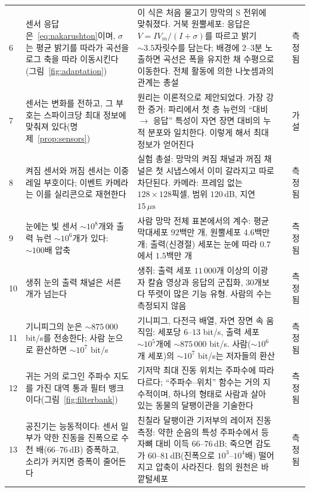 {\begin{longtable}{>{\raggedright}p{0.5cm}>{\raggedright}p{4.0cm}>{\raggedright}p{5.6cm}>{\raggedright}p{2.3cm}>{\raggedright\arraybackslash}p{1.7cm}}
6 & 센서 응답은~\eqref{eq:nakarushton}이며, $\sigma$는 평균 밝기를 따라가 곡선을 로그 축을 따라 이동시킨다(그림~\ref{fig:adaptation}) & 이 식은 처음 물고기 망막의 S 전위에 맞춰졌다. 거북 원뿔세포: 응답은 $V=I V_m/(I+\sigma)$를 따르고 밝기 $\sim3.5$자릿수를 담는다; 배경에 $2$--$3$분 노출하면 곡선은 폭을 유지한 채 수평으로 이동한다. 전체 활동에 의한 나눗셈과의 관계는 총설 & \cite{NakaRushton1966,NormannPerlman1979,Carandini2012} & 측정됨 \\
7 & 센서는 변화를 전하고, 그 부호는 스파이크당 최대 정보에 맞춰져 있다(명제~\ref{prop:sensors}) & 원리는 이론적으로 제안되었다. 가장 강한 증거: 파리에서 첫 층 뉴런의 “대비 $\to$ 응답” 특성이 자연 장면 대비의 누적 분포와 일치한다. 이렇게 해서 최대 정보가 얻어진다 & \cite{Barlow1961,Laughlin1981} & 가설 \\
8 & 켜짐 센서와 꺼짐 센서는 이중 레일 부호이다; 이벤트 카메라는 이를 실리콘으로 재현한다 & 실험 총설: 망막의 켜짐 채널과 꺼짐 채널은 첫 시냅스에서 이미 갈라지고 따로 차단된다. 카메라: 프레임 없는 $128\times128$픽셀, 범위 $120$\,dB, 지연 $15\,\mu\text{s}$ & \cite{Schiller1992,Lichtsteiner2008,Gallego2022} & 측정됨 \\
9 & 눈에는 빛 센서 $\sim10^8$개와 출력 뉴런 $\sim10^6$개가 있다: $\sim100$배 압축 & 사람 망막 전체 표본에서의 계수: 평균 막대세포 $92$백만 개, 원뿔세포 $4.6$백만 개; 출력(신경절) 세포는 눈에 따라 $0.7$에서 $1.5$백만 개 & \cite{Curcio1990,CurcioAllen1990} & 측정됨 \\
10 & 생쥐 눈의 출력 채널은 서른 개가 넘는다 & 생쥐: 출력 세포 $11\,000$개 이상의 이광자 칼슘 영상과 응답의 군집화, $30$개보다 뚜렷이 많은 기능 유형. 사람의 수는 측정되지 않음 & \cite{Baden2016} & 측정됨 \\
11 & 기니피그의 눈은 $\sim875\,000$ bit/s를 전송한다; 사람 눈으로 환산하면 $\sim10^7$ bit/s & 기니피그, 다전극 배열, 자연 장면 속 움직임: 세포당 $6$--$13$ bit/s, 출력 세포 $\sim10^5$개에 $\sim875\,000$ bit/s. 사람($\sim10^6$개 세포)의 $\sim10^7$ bit/s는 저자들의 환산 & \cite{Koch2006} & 측정됨 \\
12 & 귀는 거의 로그인 주파수 지도를 가진 대역 통과 필터 뱅크이다(그림~\ref{fig:filterbank}) & 기저막 최대 진동 위치는 주파수에 따라 다르다; “주파수--위치” 함수는 거의 지수적이며, 하나의 형태로 사람과 살아 있는 동물의 달팽이관을 기술한다 & \cite{Greenwood1990,Robles2001} & 측정됨 \\
13 & 공진기는 능동적이다: 센서 일부가 약한 진동을 진폭으로 수천 배($66$--$76$\,dB) 증폭하고, 소리가 커지면 증폭이 줄어든다 & 친칠라 달팽이관 기저부의 레이저 진동 측정: 약한 순음의 특성 주파수에서 등자뼈 대비 이득 $66$--$76$\,dB; 죽으면 감도가 $60$--$81$\,dB(진폭으로 $10^3$--$10^4$배) 떨어지고 압축이 사라진다. 힘의 원천은 바깥털세포 & \cite{Ruggero1997,Robles2001} & 측정됨 \\

\end{longtable}}
